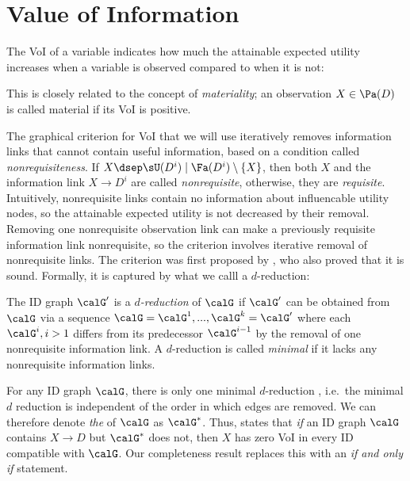 \section{Value of Information} \label{sec:voi-part-1}
The VoI of a variable
indicates how much the attainable expected utility increases when a variable is observed compared to when it is not:



This is closely related to the concept of \emph{materiality}; an observation $X \in \Pa(D)$ is called 
material if its VoI is positive.

The graphical criterion for VoI that
we will use iteratively removes information links that cannot contain useful information,
based on a condition called \emph{nonrequisiteness}.
If $X\dsep \sU(D^i)\mid \Fa(D^i)\setminus\{X\}$, then both $X$ and the information link $X\to D^i$ 
are called \emph{nonrequisite}, otherwise, they are \emph{requisite}.
Intuitively, nonrequisite links contain no information about 
influencable utility nodes, so the attainable expected utility is not 
decreased by their removal.
Removing one nonrequisite observation link can make a previously requisite information link nonrequisite, 
so the criterion involves iterative removal of nonrequisite links.
The criterion was first proposed by \citet{nilsson2000evaluating}, who also proved that it is sound. 
Formally, it is captured by what we calll a $d$-reduction:

\begin{definition}[$d$-reduction]
\label{def:d-reduction}
  The ID graph $\calG'$ is a \emph{$d$-reduction} of $\calG$ if $\calG'$ can be obtained from
  $\calG$ via a sequence $\calG=\calG^1,...,\calG^k=\calG'$
  where each $\calG^i,i>1$ differs from its predecessor $\calG^{i-1}$
  by the removal of one nonrequisite information link.
  A $d$-reduction is called \emph{minimal} if it lacks any nonrequisite information links.~ 
\end{definition}

For any ID graph $\calG$, there is only one minimal $d$-reduction \citep{nilsson2000evaluating},
i.e.\ the minimal $d$ reduction is independent of the order in which edges are removed.
We can therefore denote \emph{the \minimaldred} of $\calG$
as $\calG^*$.
Thus, \citet[Theorem 3]{nilsson2000evaluating} states that \emph{if} an ID graph $\calG$ contains $X \to D$
but %
$\calG^*$ does not, then $X$ has zero VoI in
every ID compatible with $\calG$.
Our completeness result replaces this with an \emph{if and only if} statement.
~




